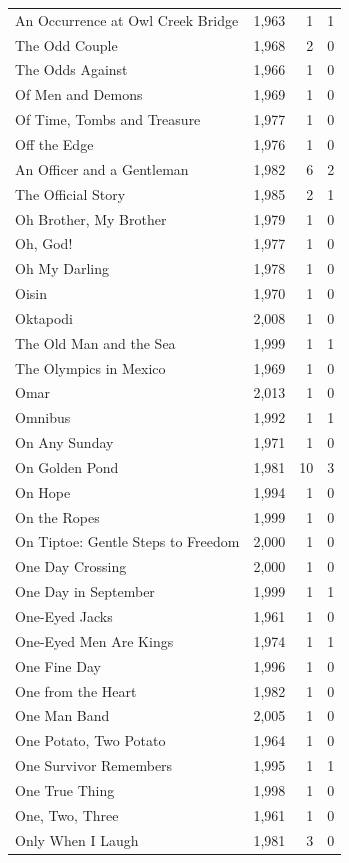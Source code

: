 \begin{tabular}{lrrr}
An Occurrence at Owl Creek Bridge & 1,963 & 1 & 1 \\
The Odd Couple & 1,968 & 2 & 0 \\
The Odds Against & 1,966 & 1 & 0 \\
Of Men and Demons & 1,969 & 1 & 0 \\
Of Time, Tombs and Treasure & 1,977 & 1 & 0 \\
Off the Edge & 1,976 & 1 & 0 \\
An Officer and a Gentleman & 1,982 & 6 & 2 \\
The Official Story & 1,985 & 2 & 1 \\
Oh Brother, My Brother & 1,979 & 1 & 0 \\
Oh, God! & 1,977 & 1 & 0 \\
Oh My Darling & 1,978 & 1 & 0 \\
Oisin & 1,970 & 1 & 0 \\
Oktapodi & 2,008 & 1 & 0 \\
The Old Man and the Sea & 1,999 & 1 & 1 \\
The Olympics in Mexico & 1,969 & 1 & 0 \\
Omar & 2,013 & 1 & 0 \\
Omnibus & 1,992 & 1 & 1 \\
On Any Sunday & 1,971 & 1 & 0 \\
On Golden Pond & 1,981 & 10 & 3 \\
On Hope & 1,994 & 1 & 0 \\
On the Ropes & 1,999 & 1 & 0 \\
On Tiptoe: Gentle Steps to Freedom & 2,000 & 1 & 0 \\
One Day Crossing & 2,000 & 1 & 0 \\
One Day in September & 1,999 & 1 & 1 \\
One-Eyed Jacks & 1,961 & 1 & 0 \\
One-Eyed Men Are Kings & 1,974 & 1 & 1 \\
One Fine Day & 1,996 & 1 & 0 \\
One from the Heart & 1,982 & 1 & 0 \\
One Man Band & 2,005 & 1 & 0 \\
One Potato, Two Potato & 1,964 & 1 & 0 \\
One Survivor Remembers & 1,995 & 1 & 1 \\
One True Thing & 1,998 & 1 & 0 \\
One, Two, Three & 1,961 & 1 & 0 \\
Only When I Laugh & 1,981 & 3 & 0 \\

\end{tabular}
